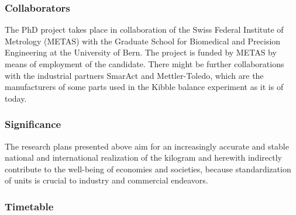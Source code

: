 \documentclass{article}
\begin{document}
\subsubsection*{Collaborators}
The PhD project takes place in collaboration of the Swiss Federal Institute of Metrology (METAS) with the Graduate School for Biomedical and Precision Engineering at the University of Bern. The project is funded by METAS by means of employment of the candidate. There might be further collaborations with the industrial partners SmarAct and Mettler-Toledo, which are the manufacturers of some parts used in the Kibble balance experiment as it is of today.

\subsubsection*{Significance}
The research plans presented above aim for an increasingly accurate and stable national and international realization of the kilogram and herewith indirectly contribute to the well-being of economies and societies, because standardization of units is crucial to industry and commercial endeavors.

\FloatBarrier
\subsubsection*{Timetable}
\vspace{-0.2cm}
\end{document}
